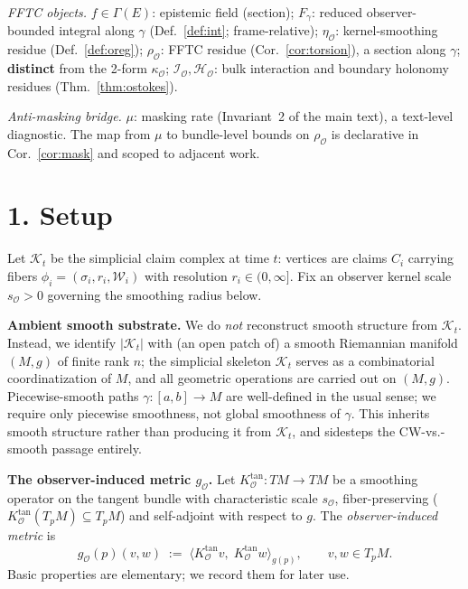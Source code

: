 \documentclass[11pt]{article}
\newcommand{\Kt}{\mathcal{K}_t}
\newcommand{\sO}{s_{\mathcal{O}}}  %
\newcommand{\Obs}{\mathcal{O}}
\newcommand{\kappaO}{\kappa_{\Obs}}
\newcommand{\HolO}{\mathcal{H}_{\Obs}}
\newcommand{\IntO}{\mathcal{I}_{\Obs}}
\newcommand{\resO}{\rho_{\Obs}}
\newcommand{\gO}{g_{\Obs}}
\newcommand{\KO}{K_{\Obs}}
\newcommand{\mask}{\mu}
\newcommand{\EE}{E}
\newcommand{\Sect}{\Gamma}
\begin{document}
\smallskip
\noindent\emph{FFTC objects.}
$f \in \Sect(\EE)$: epistemic field (section);
$F_\gamma$: reduced observer-bounded integral along $\gamma$
(Def.~\ref{def:int}; frame-relative);
$\eta_\Obs$: kernel-smoothing residue (Def.~\ref{def:oreg});
$\resO$: FFTC residue (Cor.~\ref{cor:torsion}), a section along
$\gamma$; \textbf{distinct} from the 2-form $\kappaO$;
$\IntO, \HolO$: bulk interaction and boundary holonomy residues
(Thm.~\ref{thm:ostokes}).

\smallskip
\noindent\emph{Anti-masking bridge.}
$\mask$: masking rate (Invariant~2 of the main text), a text-level
diagnostic. The map from $\mask$ to bundle-level bounds on $\resO$ is
declarative in Cor.~\ref{cor:mask} and scoped to adjacent work.

\section*{1. Setup}

Let $\Kt$ be the simplicial claim complex at time $t$: vertices are
claims $C_i$ carrying fibers $\phi_i = (\sigma_i, r_i, \mathcal{W}_i)$
with resolution $r_i \in (0, \infty]$. Fix an observer kernel scale
$\sO > 0$ governing the smoothing radius below.

\smallskip
\noindent\textbf{Ambient smooth substrate.}
We do \emph{not} reconstruct smooth structure from $\Kt$. Instead, we
identify $|\Kt|$ with (an open patch of) a smooth Riemannian manifold
$(M, g)$ of finite rank $n$; the simplicial skeleton $\Kt$ serves as
a combinatorial coordinatization of $M$, and all geometric operations
are carried out on $(M, g)$. Piecewise-smooth paths
$\gamma: [a, b] \to M$ are well-defined in the usual sense; we
require only piecewise smoothness, not global smoothness of $\gamma$.
This inherits smooth structure rather than producing it from $\Kt$,
and sidesteps the CW-vs.-smooth passage entirely.

\smallskip
\noindent\textbf{The observer-induced metric $\gO$.}
Let $\KO^{\mathrm{tan}}: TM \to TM$ be a smoothing operator on the
tangent bundle with characteristic scale $\sO$, fiber-preserving
($\KO^{\mathrm{tan}}(T_pM) \subseteq T_pM$) and self-adjoint with
respect to $g$. The \emph{observer-induced metric} is
\begin{equation}
\gO(p)(v, w) \;:=\; \big\langle \KO^{\mathrm{tan}} v,\; \KO^{\mathrm{tan}} w\big\rangle_{g(p)},
\qquad v, w \in T_pM.
\label{eq:gO-def}
\end{equation}
Basic properties are elementary; we record them for later use.
\end{document}
